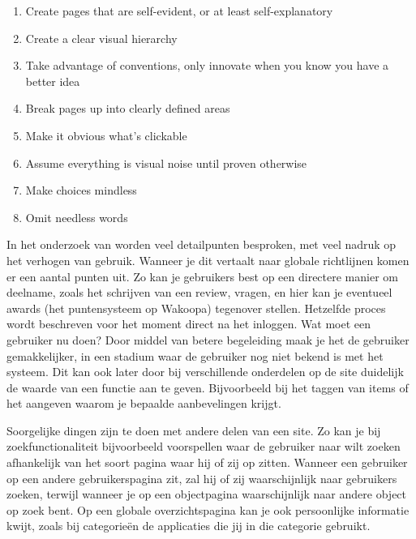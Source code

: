 \documentclass[a4paper, 10pt, pdftex]{report}
\begin{document}
      \begin{enumerate}
        \item Create pages that are self-evident, or at least self-explanatory
        \item Create a clear visual hierarchy
        \item Take advantage of conventions, only innovate when you know you have a better idea
        \item Break pages up into clearly defined areas
        \item Make it obvious what's clickable
        \item Assume everything is visual noise until proven otherwise
        \item Make choices mindless
        \item Omit needless words
      \end{enumerate}

    In het onderzoek van \citeauthor{Alfrink2008} worden veel detailpunten besproken, met veel nadruk op het verhogen van gebruik. Wanneer je dit vertaalt naar globale richtlijnen komen er een aantal punten uit. Zo kan je gebruikers best op een directere manier om deelname, zoals het schrijven van een review, vragen, en hier kan je eventueel awards (het puntensysteem op Wakoopa) tegenover stellen. Hetzelfde proces wordt beschreven voor het moment direct na het inloggen. Wat moet een gebruiker nu doen? Door middel van betere begeleiding maak je het de gebruiker gemakkelijker, in een stadium waar de gebruiker nog niet bekend is met het systeem. Dit kan ook later door bij verschillende onderdelen op de site duidelijk de waarde van een functie aan te geven. Bijvoorbeeld bij het taggen van items of het aangeven waarom je bepaalde aanbevelingen krijgt.

    Soorgelijke dingen zijn te doen met andere delen van een site. Zo kan je bij zoekfunctionaliteit bijvoorbeeld voorspellen waar de gebruiker naar wilt zoeken afhankelijk van het soort pagina waar hij of zij op zitten. Wanneer een gebruiker op een andere gebruikerspagina zit, zal hij of zij waarschijnlijk naar gebruikers zoeken, terwijl wanneer je op een objectpagina waarschijnlijk naar andere object op zoek bent. Op een globale overzichtspagina kan je ook persoonlijke informatie kwijt, zoals bij categorie\"en de applicaties die jij in die categorie gebruikt.
\end{document}
